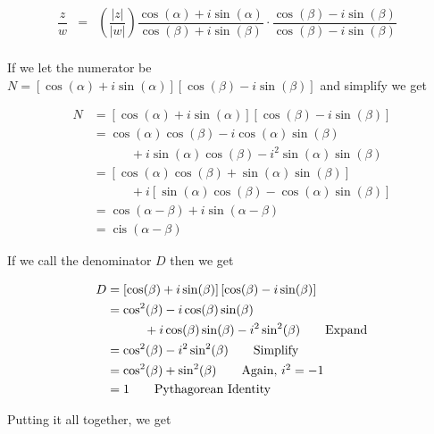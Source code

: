 \[\begin{array}{rcll}

\dfrac{z}{w}	& = & \left( \dfrac{|z|}{|w|}\right) \dfrac{\cos(\alpha) + i \sin(\alpha)}{\cos(\beta) + i \sin(\beta)} \cdot \dfrac{\cos(\beta) - i \sin(\beta)}{\cos(\beta) - i \sin(\beta)} & \\ \end{array}\]

If we let the numerator be $N = \left[\cos(\alpha) + i \sin(\alpha)\right] \left[\cos(\beta) - i \sin(\beta)\right]$ and simplify we get

\begin{align*}
N & = \left[\cos(\alpha) + i \sin(\alpha)\right] \left[\cos(\beta) - i \sin(\beta)\right]  \\ 
  & =  \cos(\alpha)\cos(\beta)-i\cos(\alpha)\sin(\beta)\\
  &\quad\quad\quad  + i \sin(\alpha)\cos(\beta) - i^2 \sin(\alpha)\sin(\beta)  \tag*{Expand} \\
	& =  \left[\cos(\alpha)\cos(\beta)+\sin(\alpha)\sin(\beta)\right]\\
	&\quad\quad\quad + i\left[\sin(\alpha)\cos(\beta) -\cos(\alpha)\sin(\beta)  \right]  \tag*{Rearrange and Factor} \\
	& = \cos(\alpha - \beta) + i \sin(\alpha - \beta)   \tag*{Difference Identities}  \\
	& =  \operatorname{cis}(\alpha - \beta) \tag*{Definition of `cis'} 
\end{align*}
	
\medskip

If we call the denominator $D$ then we get


\begin{align*}
D & =  \left[\cos(\beta) + i\sin(\beta)\right]\left[\cos(\beta) - i\sin(\beta)\right]  \\ 
  & =  \cos^{2}(\beta) - i\cos(\beta)\sin(\beta)\\
  &\quad\quad\quad  + i\cos(\beta)\sin(\beta) - i^2 \sin^{2}(\beta)  \tag*{Expand}  \\
  & =  \cos^{2}(\beta) - i^2 \sin^{2}(\beta)  \tag*{Simplify}  \\
  & =  \cos^{2}(\beta) + \sin^{2}(\beta)   \tag*{Again, $i^{2} = -1$}\\
  & =  	1   \tag*{Pythagorean Identity}
\end{align*}


\medskip
																										 
Putting it all together, we get

